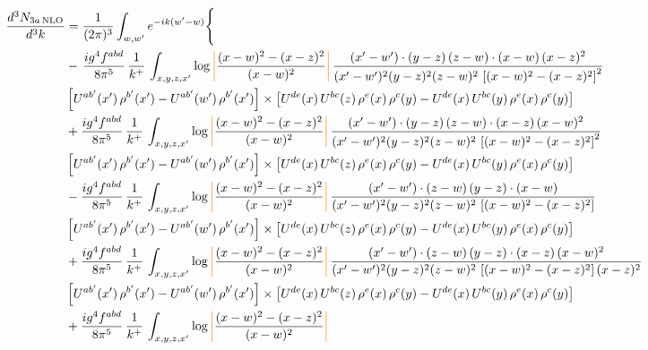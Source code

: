 \documentclass[9pt]{article}
\numberwithin{equation}{section}
\begin{document}
\begin{align}
\frac{d^{3}N_{3a\,\rm NLO}}{d^{3}k} & = \frac{1}{(2\pi)^{3}}\int_{w,w'}e^{-ik(w'-w)}\Bigg\{\notag \\
& -\,\frac{ig^{4}f^{abd}}{8\pi^{5}}\,\frac{1}{k^{+}}\,\int_{x,y,z,x'}\log{\textcolor{orange}{\left|\textcolor{black}{\frac{(x-w)^{2}-(x-z)^{2}}{(x-w)^{2}}}\right|}}\,
\frac{(x'-w')\cdot(y-z)\,(z-w)\cdot(x-w)\,(x-z)^{2}}{(x'-w')^{2}(y-z)^{2}(z-w)^{2}\,\left[(x-w)^{2}-(x-z)^{2}\right]^{2}}\notag \\ & \left[U^{ab'}(x')\,\rho^{b'}(x')-U^{ab'}(w')\, \rho^{b'}(x')\right]\times \left[U^{de}(x)\,U^{bc}(z)\, \rho^{e}(x)\,\rho^{c}(y)-U^{de}(x)\,U^{bc}(y)\,\rho^{e}(x)\,\rho^{c}(y)\right] \notag \\
& +\frac{ig^{4}f^{abd}}{8\pi^{5}}\,\frac{1}{k^{+}}\,\int_{x,y,z,x'}\log{\textcolor{orange}{\left|\textcolor{black}{\frac{(x-w)^{2}-(x-z)^{2}}{(x-w)^{2}}}\right|}}\,
\frac{(x'-w')\cdot(y-z)\,(z-w)\cdot(x-z)\,(x-w)^{2}}{(x'-w')^{2}(y-z)^{2}(z-w)^{2}\,\left[(x-w)^{2}-(x-z)^{2}\right]^{2}}\notag \\ 
&\left[U^{ab'}(x')\,\rho^{b'}(x')-U^{ab'}(w')\, \rho^{b'}(x')\right]\times \left[U^{de}(x)\,U^{bc}(z)\, \rho^{e}(x)\,\rho^{c}(y)-U^{de}(x)\,U^{bc}(y)\,\rho^{e}(x)\,\rho^{c}(y)\right] \notag \\
& -\frac{ig^{4}f^{abd}}{8\pi^{5}}\,\frac{1}{k^{+}}\,\int_{x,y,z,x'}\log{\textcolor{orange}{\left|\textcolor{black}{\frac{(x-w)^{2}-(x-z)^{2}}{(x-w)^{2}}}\right|}}\,
\frac{(x'-w')\cdot(z-w)\,(y-z)\cdot(x-w)}{(x'-w')^{2}(y-z)^{2}(z-w)^{2}\,\left[(x-w)^{2}-(x-z)^{2}\right]}\notag \\ & \left[U^{ab'}(x')\,\rho^{b'}(x')-U^{ab'}(w')\, \rho^{b'}(x')\right]\times \left[U^{de}(x)\,U^{bc}(z)\, \rho^{e}(x)\,\rho^{c}(y)-U^{de}(x)\,U^{bc}(y)\,\rho^{e}(x)\,\rho^{c}(y)\right] \notag \\
&  +\frac{ig^{4}f^{abd}}{8\pi^{5}}\,\frac{1}{k^{+}}\,\int_{x,y,z,x'}\log{\textcolor{orange}{\left|\textcolor{black}{\frac{(x-w)^{2}-(x-z)^{2}}{(x-w)^{2}}}\right|}}\,
\frac{(x'-w')\cdot(z-w)\,(y-z)\cdot(x-z)\,(x-w)^{2}}{(x'-w')^{2}(y-z)^{2}(z-w)^{2}\,\left[(x-w)^{2}-(x-z)^{2}\right](x-z)^{2}}\notag \\ & \left[U^{ab'}(x')\,\rho^{b'}(x')-U^{ab'}(w')\, \rho^{b'}(x')\right]\times \left[U^{de}(x)\,U^{bc}(z)\, \rho^{e}(x)\,\rho^{c}(y)-U^{de}(x)\,U^{bc}(y)\,\rho^{e}(x)\,\rho^{c}(y)\right] \notag \\
& +\frac{ig^{4}f^{abd}}{8\pi^{5}}\,\frac{1}{k^{+}}\,\int_{x,y,z,x'}\log{\textcolor{orange}{\left|\textcolor{black}{\frac{(x-w)^{2}-(x-z)^{2}}{(x-w)^{2}}}\right|}}\,

\end{align}
\end{document}
